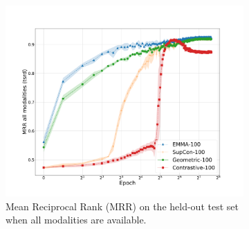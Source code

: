 \documentclass[10pt]{article} %
\begin{document}

\begin{figure}
    \centering
    \begin{subfigure}[b]{0.49\textwidth}
        \centering
        \includegraphics[width=\textwidth]{Figures/average-seeds-epochs-mrr_lard-trimmed.pdf}
        \caption[]{Mean Reciprocal Rank (MRR) on the held-out test set when all modalities are available.}    
        \label{fig:epochs-mrr.lard}
    \end{subfigure}
    \hfill
    \begin{subfigure}[b]{0.49\textwidth}  
        \centering 

\end{subfigure}
\end{figure}
\end{document}
